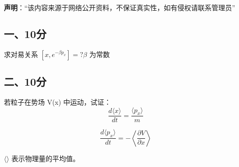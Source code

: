 
\textbf{声明}：“该内容来源于网络公开资料，不保证真实性，如有侵权请联系管理员”

\subsection{一、10分}
求对易关系 $[x, e^{-\beta p_x}] = ? \beta$ 为常数
\subsection{二、10分}
若粒子在势场  V(x) 中运动，试证：
$$\frac{d \langle x \rangle}{dt} = \frac{\langle p_x \rangle}{m}~$$

$$\frac{d \langle p_x \rangle}{dt} = -\left\langle \frac{\partial V}{\partial x} \right\rangle~$$

$\langle  \rangle$ 表示物理量的平均值。